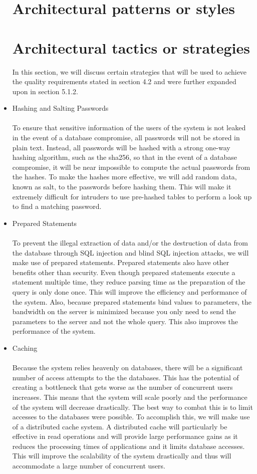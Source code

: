 \documentclass[a4paper]{article}
\begin{document}
\begin{itemize}
    
\section{Architectural patterns or styles}

\section{Architectural tactics or strategies}
In this section, we will discuss certain strategies that will be used to achieve the quality requirements stated in section 4.2 and were further expanded upon in section 5.1.2.
\item Hashing and Salting Passwords \\\\
To ensure that sensitive information of the users of the system is not leaked in the event of a database compromise, all passwords will not be stored in plain text. Instead, all passwords will be hashed with a strong one-way hashing algorithm, such as the sha256, so that in the event of a database compromise, it will be near impossible to compute the actual passwords from the hashes. To make the hashes more effective, we will add random data, known as salt, to the passwords before hashing them. This will make it extremely difficult for intruders to use pre-hashed tables to perform a look up to find a matching password.
\\
\item Prepared Statements \\\\
To prevent the illegal extraction of data and/or the destruction of data from the database through SQL injection and blind SQL injection attacks, we will make use of prepared statements. Prepared statements also have other benefits other than security. Even though prepared statements execute a statement multiple time, they reduce parsing time as the preparation of the query is only done once. This will improve the efficiency and performance of the system. Also, because prepared statements bind values to parameters, the bandwidth on the server is minimized because you only need to send the parameters to the server and not the whole query. This also improves the performance of the system.
\\
\item Caching \\\\
Because the system relies heavenly on databases, there will be a significant number of access attempts to the the databases. This has the potential of creating a bottleneck that gets worse as the number of concurrent users increases. This means that the system will scale poorly and the performance of the system will decrease drastically. The best way to combat this is to limit accesses to the databases were possible. To accomplish this, we will make use of a distributed cache system. A distributed cache will particularly be effective in read operations and will provide large performance gains as it reduces the processing times of applications and it limits database accesses. This will improve the scalability of the system drastically and thus will accommodate a large number of concurrent users. 

\end{itemize}
\end{document}
